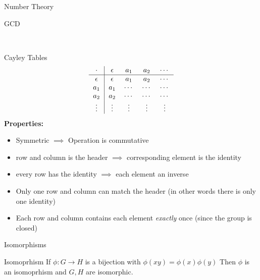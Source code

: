\documentclass{article}
\begin{document}
\begin{multicols*}{3}
\begin{blackbox}{Number Theory}
\begin{bluebox}{GCD}
\end{bluebox}
\\[-2ex]
\end{blackbox}
\begin{blackbox}{Cayley Tables}
\[\begin{tabular}{c|cccc}
    $\cdot$ &  $\epsilon$ & $a_1$ &$ a_2 $& $\cdots$ \\
    \hline
    $\epsilon$ & $\epsilon$ & $a_1$ & $a_2$ & $\cdots$ \\
    $a_1$ & $a_1$ & $\cdots$ & $\cdots$ & $\cdots$\\
    $a_2$ & $a_2$ & $\cdots$ & $\cdots$ & $\cdots$\\
    $\vdots$ & $\vdots$ & $\vdots$ & $\vdots$ & $\vdots$\\
\end{tabular}\]
\textbf{Properties:}
\begin{itemize}
    \item Symmetric $\implies$ Operation is commutative
    \item row and column is the header $\implies$ corresponding element is the identity
    \item every row has the identity $\implies$ each element an inverse
    \item Only one row and column can match the header (in other words there is only one identity)
    \item Each row and column contains each element \emph{exactly} once (since the group is closed)
\end{itemize}
\end{blackbox}
\begin{blackbox}{Isomorphisms}
\begin{brownbox}{Isomoprhism}
    If $\phi: G \rightarrow H$ is a bijection with $\phi(xy) = \phi(x)\phi(y)$ Then $\phi$ is an isomoprhism and $G,H$ are isomorphic. 
\end{brownbox}

\end{blackbox}
\end{multicols*}
\end{document}
